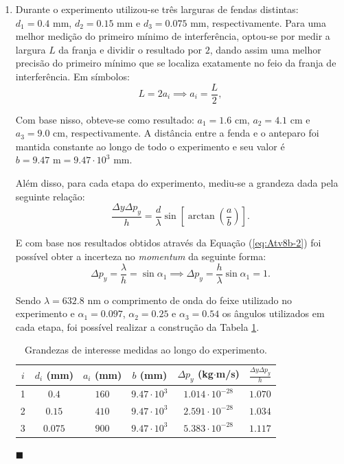 \documentclass[12pt,a4paper]{article}
\begin{document}
\begin{enumerate}[label = \alph*)]
        
        \item Durante o experimento utilizou-se três larguras de fendas distintas: $d_1=0.4\text{ mm}$, $d_2=0.15\text{ mm}$ e $d_3=0.075\text{ mm}$, respectivamente. Para uma melhor medição do primeiro mínimo de interferência, optou-se por medir a largura $L$ da franja e dividir o resultado por $2$, dando assim uma melhor precisão do primeiro mínimo que se localiza exatamente no feio da franja de interferência. Em símbolos:
        \begin{equation}\label{eq:Atv8b-1}
            L=2a_i\implies a_i=\frac{L}{2},
        \end{equation}

        Com base nisso, obteve-se como resultado: $a_1=1.6\text{ cm}$, $a_2=4.1\text{ cm}$ e $a_3=9.0\text{ cm}$, respectivamente. A distância entre a fenda e o anteparo foi mantida constante ao longo de todo o experimento e seu valor é $b=9.47\text{ m}=9.47\cdot10^{3}\text{ mm}$.

        Além disso, para cada etapa do experimento, mediu-se a grandeza dada pela seguinte relação:
        \begin{equation}\label{eq:Atv8b-2}
            \frac{\Delta y\Delta p_y}{h}=\frac{d}{\lambda}\sin{\left[\arctan{\left(\frac{a}{b}\right)}\right]}.
        \end{equation}

        E com base nos resultados obtidos através da Equação (\ref{eq:Atv8b-2}) foi possível obter a incerteza no \textit{momentum} da seguinte forma:
        \begin{equation}\label{eq:Atv8b-3}
            \Delta p_y=\frac{\lambda}{h}=\sin{\alpha_1}\implies\Delta p_y=\frac{h}{\lambda}\sin{\alpha_1}=1.
        \end{equation}

        Sendo $\lambda=632.8\text{ nm}$ o comprimento de onda do feixe utilizado no experimento e $\alpha_1=0.097$, $\alpha_2=0.25$ e $\alpha_3=0.54$ os ângulos utilizados em cada etapa, foi possível realizar a construção da Tabela \ref{tab:Atv8b}.
        \begin{table}[htp!]
            \centering
            \caption{Grandezas de interesse medidas ao longo do experimento.}
            \begin{tabular}{|c|c|c|c|c|c|}
            \hline
               $i$ & $d_i$ (mm)  & $a_i$ (mm) & $b$ (mm) & $\Delta p_y$ (kg$\cdot$m/s) & $\frac{\Delta y\Delta p_y}{h}$ \\
            \hline
                1 & $0.4$ & $160$ & $9.47\cdot10^{3}$ & $1.014\cdot10^{-28}$ & $1.070$ \\
                2 & $0.15$ & $410$ & $9.47\cdot10^{3}$ & $2.591\cdot10^{-28}$ & $1.034$ \\
                3 & $0.075$ & $900$ & $9.47\cdot10^{3}$ & $5.383\cdot10^{-28}$ & $1.117$ \\
            \hline
            \end{tabular}
            \label{tab:Atv8b}
        \end{table}
        \begin{flushright}
            $\blacksquare$
        \end{flushright}


\end{enumerate}
\end{document}
